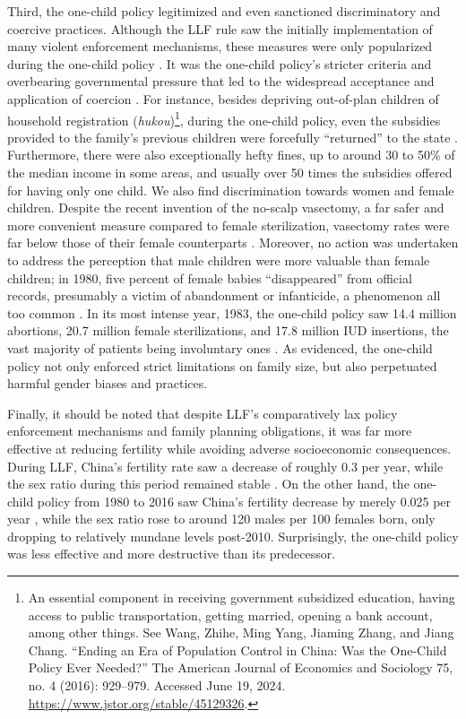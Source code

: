 Third, the one-child policy legitimized and even sanctioned discriminatory and coercive practices. Although the LLF rule saw the initially implementation of many violent enforcement mechanisms, these measures were only popularized during the one-child policy \autocite[pp.\ 150--151]{WhyteWangCai2015}. It was the one-child policy’s stricter criteria and overbearing governmental pressure that led to the widespread acceptance and application of coercion \autocite{LiXiaorong2015LicenseToCoerce}. For instance, besides depriving out-of-plan children of household registration (\emph{hukou})\footnote{An essential component in receiving government subsidized education, having access to public transportation, getting married, opening a bank account, among other things. See Wang, Zhihe, Ming Yang, Jiaming Zhang, and Jiang Chang. “Ending an Era of Population Control in China: Was the One-Child Policy Ever Needed?” The American Journal of Economics and Sociology 75, no. 4 (2016): 929–979. Accessed June 19, 2024. \url{https://www.jstor.org/stable/45129326}.}, during the one-child policy, even the subsidies provided to the family’s previous children were forcefully “returned” to the state \autocite[p.\ 157--158]{LiXiaorong2015LicenseToCoerce}. Furthermore, there were also exceptionally hefty fines, up to around 30 to 50\% of the median income in some areas, and usually over 50 times the subsidies offered for having only one child. We also find discrimination towards women and female children. Despite the recent invention of the no-scalp vasectomy, a far safer and more convenient measure compared to female sterilization, vasectomy rates were far below those of their female counterparts \autocite[p.\ 2]{GonzalesEtAl1992NoScalpel}. Moreover, no action was undertaken to address the perception that male children were more valuable than female children; in 1980, five percent of female babies “disappeared” from official records, presumably a victim of abandonment or infanticide, a phenomenon all too common \autocite[pp.\ 159--160]{LiXiaorong2015LicenseToCoerce}. In its most intense year, 1983, the one-child policy saw 14.4 million abortions, 20.7 million female sterilizations, and 17.8 million IUD insertions, the vast majority of patients being involuntary ones \autocite[p.\ 154]{WhyteWangCai2015}. As evidenced, the one-child policy not only enforced strict limitations on family size, but also perpetuated harmful gender biases and practices. 

Finally, it should be noted that despite LLF’s comparatively lax policy enforcement mechanisms and family planning obligations, it was far more effective at reducing fertility while avoiding adverse socioeconomic consequences. During LLF, China’s fertility rate saw a decrease of roughly 0.3 per year, while the sex ratio during this period remained stable \autocite{FangChen2018VoxEU}. On the other hand, the one-child policy from 1980 to 2016 saw China’s fertility decrease by merely 0.025 per year \autocite{HuangSilverPew2022}, while the sex ratio rose to around 120 males per 100 females born, only dropping to relatively mundane levels post-2010. Surprisingly, the one-child policy was less effective and more destructive than its predecessor.

